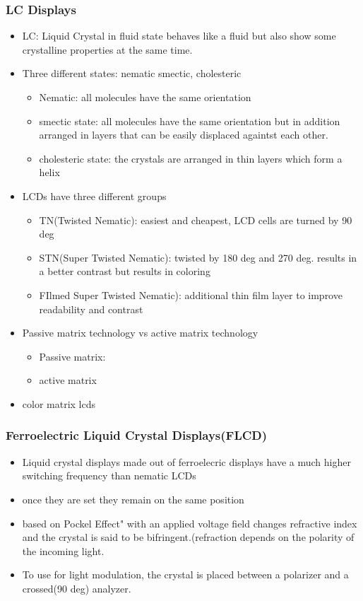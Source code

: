 \documentclass{standalone}
\begin{document}
\subsubsection*{LC Displays}
\begin{itemize}
\item LC: Liquid Crystal in fluid state behaves like a fluid but also show some crystalline properties at the same time.
\item Three different states: nematic smectic, cholesteric
\begin{itemize}
\item Nematic: all molecules have the same orientation
\item smectic state: all molecules have the same orientation but in addition arranged in layers that can be easily displaced againtst each other.
\item cholesteric state: the crystals are arranged in thin layers which form a helix
\end{itemize}
\item LCDs have three different groups
\begin{itemize}
\item TN(Twisted Nematic): easiest and cheapest, LCD cells are turned by 90 deg
\item STN(Super Twisted Nematic): twisted by 180 deg and 270 deg. results in a better contrast but results in coloring
\item FIlmed Super Twisted Nematic): additional thin film layer to improve readability and contrast
\end{itemize}
\item Passive matrix technology vs active matrix technology
\begin{itemize}
\item Passive matrix:
\item active matrix
\end{itemize}
\item color matrix lcds
\end{itemize}

\subsubsection*{Ferroelectric Liquid Crystal Displays(FLCD)}
\begin{itemize}
\item Liquid crystal displays made out of ferroelecric displays have a much higher switching frequency than nematic LCDs
\item once they are set they remain on the same position
\item based on Pockel Effect" with an applied voltage field changes refractive index and the crystal is said to be bifringent.(refraction depends on the polarity of the incoming light.
\item To use for light modulation, the crystal is placed between a polarizer and a crossed(90 deg) analyzer.
\end{itemize}
\end{document}
